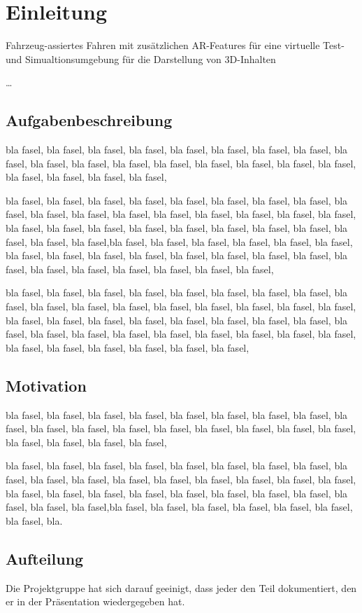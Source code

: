 \section{Einleitung}

Fahrzeug-assiertes Fahren mit zusätzlichen AR-Features für eine virtuelle Test- und Simualtionsumgebung für die Darstellung von 3D-Inhalten 

\ldots 

\subsection{Aufgabenbeschreibung}

bla fasel, bla fasel, bla fasel, bla fasel, bla fasel, bla fasel, bla fasel, bla fasel, bla fasel, bla fasel, bla fasel, bla fasel, bla fasel, bla fasel, bla fasel, bla fasel, bla fasel, bla fasel, bla fasel, bla fasel, bla fasel, 

bla fasel, bla fasel, bla fasel, bla fasel, bla fasel, bla fasel, bla fasel, bla fasel, bla fasel, bla fasel, bla fasel, bla fasel, bla fasel, bla fasel, bla fasel, bla fasel, bla fasel, bla fasel, bla fasel, bla fasel, bla fasel, bla fasel, bla fasel, bla fasel, bla fasel, bla fasel, bla fasel, bla fasel,bla fasel, bla fasel, bla fasel, bla fasel, bla fasel, bla fasel, bla fasel, bla fasel, bla fasel, bla fasel, bla fasel, bla fasel, bla fasel, bla fasel, bla fasel, bla fasel, bla fasel, bla fasel, bla fasel, bla fasel, bla fasel, 

bla fasel, bla fasel, bla fasel, bla fasel, bla fasel, bla fasel, bla fasel, bla fasel, bla fasel, bla fasel, bla fasel, bla fasel, bla fasel, bla fasel, bla fasel, bla fasel, bla fasel, bla fasel, bla fasel, bla fasel, bla fasel, bla fasel, bla fasel, bla fasel, bla fasel, bla fasel, bla fasel, bla fasel,
bla fasel, bla fasel, bla fasel, bla fasel, bla fasel, bla fasel, bla fasel, bla fasel, bla fasel, bla fasel, bla fasel, bla fasel,

\subsection{Motivation}
bla fasel, bla fasel, bla fasel, bla fasel, bla fasel, bla fasel, bla fasel, bla fasel, bla fasel, bla fasel, bla fasel, bla fasel, bla fasel, bla fasel, bla fasel, bla fasel, bla fasel, bla fasel, bla fasel, bla fasel, bla fasel, 



bla fasel, bla fasel, bla fasel, bla fasel, bla fasel, bla fasel, bla fasel, bla fasel, bla fasel, bla fasel, bla fasel, bla fasel, bla fasel, bla fasel, bla fasel, bla fasel, bla fasel, bla fasel, bla fasel, bla fasel, bla fasel, bla fasel, bla fasel, bla fasel, bla fasel, bla fasel, bla fasel, bla fasel,bla fasel, bla fasel, bla fasel, bla fasel, bla fasel, bla fasel, bla fasel, bla.

\subsection{Aufteilung}
Die Projektgruppe hat sich darauf geeinigt, dass jeder den Teil dokumentiert, den er in der Präsentation wiedergegeben hat.